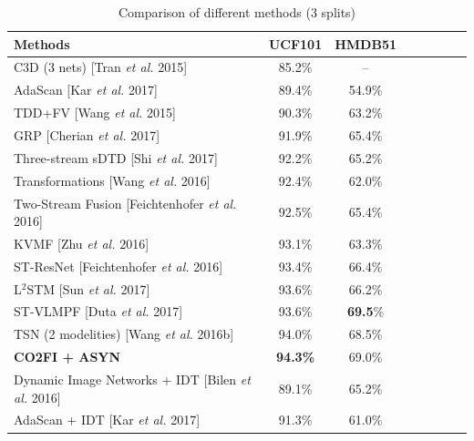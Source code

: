 \documentclass[letterpaper]{article} %
\begin{document}
\begin{table}
\centering
\caption{Comparison of different methods (3 splits) %
}\label{tab:cmcTable3}
\scriptsize{
\begin{tabular}{|p{5.3cm}|c|*{5}{c|}c}
\hline
\textbf{Methods}& UCF101& HMDB51 \\
\hline
C3D (3 nets) [Tran \emph{et al.} 2015]&  85.2\%& -- \\%
AdaScan [Kar \emph{et al.} 2017] &  89.4\%& 54.9\% \\%
TDD+FV [Wang \emph{et al.} 2015]&  90.3\%& 63.2\% \\%
GRP [Cherian \emph{et al.} 2017]&  91.9\%& 65.4\%\\
Three-stream sDTD [Shi \emph{et al.} 2017]&  92.2\%& 65.2\%\\
Transformations [Wang \emph{et al.} 2016] &  92.4\%& 62.0\%\\  %
Two-Stream Fusion [Feichtenhofer \emph{et al.} 2016]&  92.5\%& 65.4\%\\
KVMF [Zhu \emph{et al.} 2016]&  93.1\%& 63.3\%\\
ST-ResNet [Feichtenhofer \emph{et al.} 2016]&  93.4\%& 66.4\%\\
L$^2$STM [Sun \emph{et al.} 2017]&  93.6\%& 66.2\%\\
ST-VLMPF [Duta \emph{et al.} 2017]&  93.6\%& {\bf 69.5}\%\\
TSN (2 modelities) [Wang \emph{et al.} 2016b] &  94.0\%& 68.5\%\\
{\bf CO2FI + ASYN}& {\bf 94.3\%}& {69.0\%}  \\
\hline
Dynamic Image Networks + IDT [Bilen \emph{et al.} 2016] &  89.1\%& 65.2\% \\%
AdaScan + IDT [Kar \emph{et al.} 2017] &  91.3\%& 61.0\% \\%

\end{tabular}}
\end{table}
\end{document}
